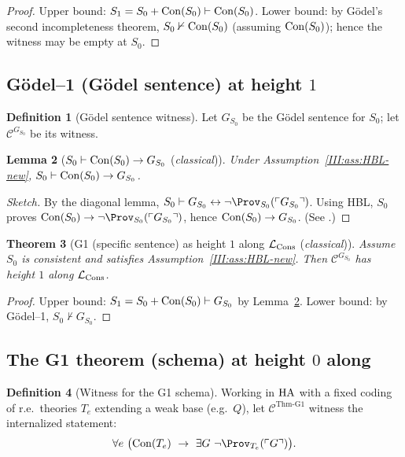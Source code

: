 \documentclass[11pt]{article}
\newtheorem{theorem}{Theorem}[section]
\newtheorem{lemma}[theorem]{Lemma}
\theoremstyle{definition}
\newtheorem{definition}[theorem]{Definition}
\theoremstyle{remark}
\begin{document}
\begin{proof}
Upper bound: \(S_1=S_0+\mathrm{Con}(S_0)\vdash \mathrm{Con}(S_0)\).
Lower bound: by G\"odel's second incompleteness theorem, \(S_0\nvdash \mathrm{Con}(S_0)\)
(assuming \(\mathrm{Con}(S_0)\)); hence the witness may be empty at \(S_0\).
\end{proof}

\subsection{G\"odel--1 (G\"odel sentence) at height \(1\)}

\begin{definition}[G\"odel sentence witness]
Let \(G_{S_0}\) be the G\"odel sentence for \(S_0\); let \(\mathcal C^{G_{S_0}}\) be its witness.
\end{definition}

\begin{lemma}[\(S_0\vdash \mathrm{Con}(S_0)\to G_{S_0}\) (\emph{classical})]\label{III:lem:Con-implies-G-new}
Under Assumption~\ref{III:ass:HBL-new}, \(S_0\vdash \mathrm{Con}(S_0)\to G_{S_0}\).
\end{lemma}

\begin{proof}[Sketch]
By the diagonal lemma, \(S_0\vdash G_{S_0}\leftrightarrow \neg\Prov_{S_0}(\ulcorner G_{S_0}\urcorner)\).
Using HBL, \(S_0\) proves \(\Con(S_0)\to \neg\Prov_{S_0}(\ulcorner G_{S_0}\urcorner)\), hence \(\mathrm{Con}(S_0)\to G_{S_0}\).
(See \cite[§I.2]{HajekPudlak}.)
\end{proof}

\begin{theorem}[G1 (specific sentence) as height \(1\) along \(\mathcal{L}_{\mathrm{Cons}}\) (\emph{classical})]\label{III:thm:G1-height1-new}
Assume \(S_0\) is consistent and satisfies Assumption~\ref{III:ass:HBL-new}.
Then \(\mathcal C^{G_{S_0}}\) has height \(1\) along \(\mathcal{L}_{\mathrm{Cons}}\).
\end{theorem}

\begin{proof}
Upper bound: \(S_1=S_0+\mathrm{Con}(S_0)\vdash G_{S_0}\) by Lemma~\ref{III:lem:Con-implies-G-new}.
Lower bound: by G\"odel--1, \(S_0\nvdash G_{S_0}\).
\end{proof}

\subsection{The G1 theorem (schema) at height \(0\) along \texorpdfstring{\LArith}{LArith}}

\begin{definition}[Witness for the G1 schema]
Working in \(\mathrm{HA}\) with a fixed coding of r.e.\ theories \(T_e\) extending a weak base (e.g.\ \(Q\)),
let \(\mathcal C^{\mathrm{Thm\mbox{-}G1}}\) witness the internalized statement:
\[
\forall e\ \big(\Con(T_e)\ \to\ \exists G\ \neg \Prov_{T_e}(\ulcorner G\urcorner)\big).
\]
\end{definition}
\end{document}
